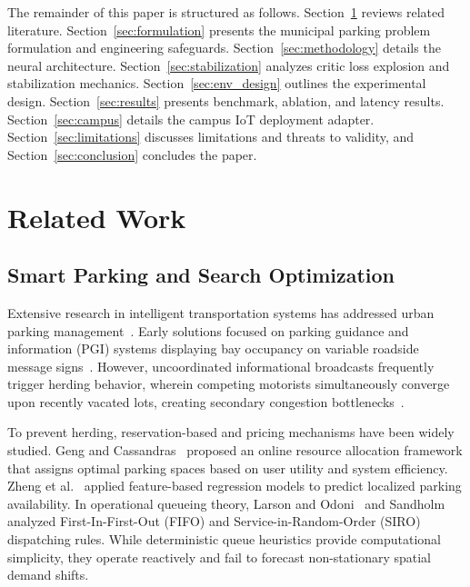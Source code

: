 \documentclass[journal]{IEEEtran}
\begin{document}
The remainder of this paper is structured as follows. Section~\ref{sec:related_work} reviews related literature. Section~\ref{sec:formulation} presents the municipal parking problem formulation and engineering safeguards. Section~\ref{sec:methodology} details the neural architecture. Section~\ref{sec:stabilization} analyzes critic loss explosion and stabilization mechanics. Section~\ref{sec:env_design} outlines the experimental design. Section~\ref{sec:results} presents benchmark, ablation, and latency results. Section~\ref{sec:campus} details the campus IoT deployment adapter. Section~\ref{sec:limitations} discusses limitations and threats to validity, and Section~\ref{sec:conclusion} concludes the paper.

\section{Related Work}
\label{sec:related_work}

\subsection{Smart Parking and Search Optimization}
Extensive research in intelligent transportation systems has addressed urban parking management~\cite{lin2017survey}. Early solutions focused on parking guidance and information (PGI) systems displaying bay occupancy on variable roadside message signs~\cite{vlahogianni2014real}. However, uncoordinated informational broadcasts frequently trigger herding behavior, wherein competing motorists simultaneously converge upon recently vacated lots, creating secondary congestion bottlenecks~\cite{arnott2006economic}. 

To prevent herding, reservation-based and pricing mechanisms have been widely studied. Geng and Cassandras~\cite{geng2013new} proposed an online resource allocation framework that assigns optimal parking spaces based on user utility and system efficiency. Zheng et al.~\cite{zheng2015parking} applied feature-based regression models to predict localized parking availability. In operational queueing theory, Larson and Odoni~\cite{larson2007urban} and Sandholm~\cite{sandholm2010prediction} analyzed First-In-First-Out (FIFO) and Service-in-Random-Order (SIRO) dispatching rules. While deterministic queue heuristics provide computational simplicity, they operate reactively and fail to forecast non-stationary spatial demand shifts.
\end{document}
